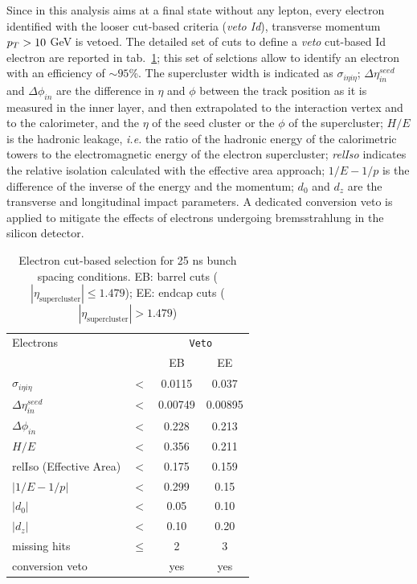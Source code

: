 \noindent Since in this analysis aims at a final state without any lepton, every electron identified with the looser cut-based criteria (\emph{veto Id}), transverse momentum $p_T > 10$ GeV is vetoed. The detailed set of cuts to define a \emph{veto} cut-based Id electron are reported in tab.~\ref{tab:EGcutBar}; this set of selctions allow to identify an electron with an efficiency of $\sim 95$\%. The supercluster width is indicated as $\sigma_{i\eta i\eta}$; $\Delta \eta_{in}^{seed}$ and $\Delta \phi_{in}$ are the difference in $\eta$ and $\phi$ between the track position as it is measured in the inner layer, and then extrapolated to the interaction vertex and to the calorimeter, and the $\eta$ of the seed cluster or the $\phi$ of the supercluster; $H/E$ is the hadronic leakage, \textit{i.e.} the ratio of the hadronic energy of the calorimetric towers to the electromagnetic energy of the electron supercluster; \emph{relIso} indicates the relative isolation calculated with the effective area approach; $1/E - 1/p$ is the difference of the inverse of the energy and the momentum; $d_0$ and $d_z$ are the transverse and longitudinal impact parameters. A dedicated conversion veto is applied to mitigate the effects of electrons undergoing bremsstrahlung in the silicon detector.

\begin{table}[htb]
 \centering
    \begin{tabular}{lccc}
     \hline

    Electrons                   &        & \multicolumn{2}{c}{\texttt{Veto}}\\
                                &        & EB      & EE     \\
 \hline
    $\sigma_{i\eta i\eta} $     & $ < $  &0.0115   &0.037  \\
    $\Delta \eta_{in}^{seed}$   & $ < $  &0.00749  &0.00895 \\
    $\Delta \phi_{in} $      & $ < $  &0.228    &0.213   \\
    $H/E $                      & $ < $  &0.356    &0.211   \\
    relIso (Effective Area)                 & $<$    &0.175    &0.159   \\
    $|1/E - 1/p|$               & $ < $  &0.299    &0.15    \\
    $|d_0|$                     & $ < $  &0.05     &0.10   \\
    $|d_z|$                     & $ < $  &0.10     &0.20   \\
    missing hits                & $\leq$ &2        &3       \\
    conversion veto             &        &  yes    &yes     \\
    
 \hline
\end{tabular}
\caption{Electron cut-based selection for 25 ns bunch spacing conditions. EB: barrel cuts ( $|\eta_\text{supercluster}| \leq 1.479$); EE: endcap cuts ( $|\eta_\text{supercluster}| > 1.479$)}
\label{tab:EGcutBar}
\end{table}

